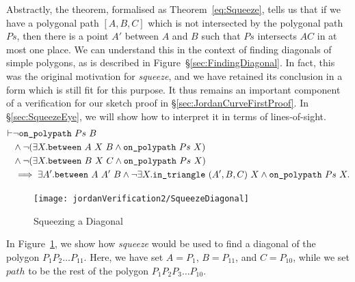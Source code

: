 Abstractly, the theorem, formalised as Theorem~\ref{eq:Squeeze}, tells us that if we have a polygonal path $[A,B,C]$ which is not intersected by the polygonal path $Ps$, then there is a point $A'$ between $A$ and $B$ such that $Ps$ intersects $AC$ in at most one place. We can understand this in the context of finding diagonals of simple polygons, as is described in Figure~\S\ref{sec:FindingDiagonal}. In fact, this was the original motivation for \emph{squeeze}, and we have retained its conclusion in a form which is still fit for this purpose. It thus remains an important component of a verification for our sketch proof in \S\ref{sec:JordanCurveFirstProof}. In \S\ref{sec:SqueezeEye}, we will show how to interpret it in terms of lines-of-sight.
\begin{equation}\label{eq:Squeeze}
  \begin{aligned}
    \vdash&\neg\texttt{on\_polypath}\ Ps\ B\\
    &\wedge \neg(\exists X. \texttt{between}\ A\ X\ B \wedge \texttt{on\_polypath}\ Ps\ X)\\
    &\wedge \neg(\exists X. \texttt{between}\ B\ X\ C \wedge \texttt{on\_polypath}\ Ps\ X)\\
    &\implies \exists A'. \texttt{between}\ A\ A'\ B \wedge \neg\exists X. \texttt{in\_triangle}\ (A',B,C)\ X\wedge \texttt{on\_polypath}\ Ps\ X.
  \end{aligned}
\end{equation}

\begin{figure}
\centering\texttt{[image: jordanVerification2/SqueezeDiagonal]}
\caption{Squeezing a Diagonal}
\label{fig:SqueezeDiagonal}
\end{figure}

In Figure~\ref{fig:SqueezeDiagonal}, we show how \emph{squeeze} would be used to find a diagonal of the polygon $P_1P_2\ldots P_{11}$. Here, we have set $A = P_1$, $B = P_{11}$, and $C = P_{10}$, while we set $path$ to be the rest of the polygon $P_1P_2P_3\ldots P_{10}$. 

